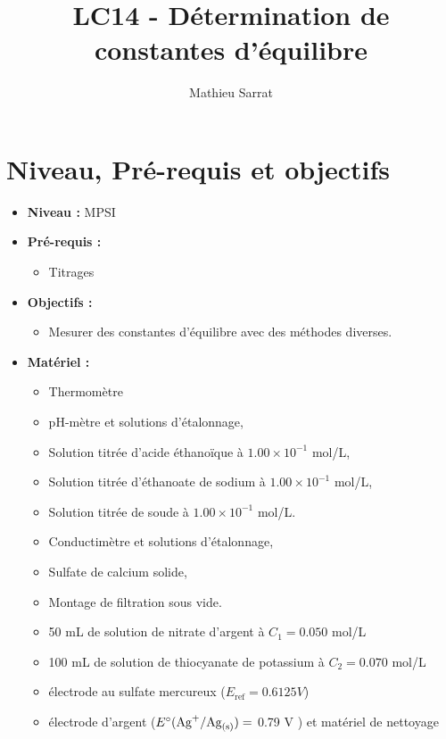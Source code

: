 \documentclass[11pt,a4paper]{report}
\author{Mathieu Sarrat}
\title{LC14 - Détermination de constantes d'équilibre}
\begin{document}
\maketitle

\section*{Niveau, Pré-requis et objectifs}
\begin{itemize}
	\item \textbf{Niveau :} MPSI\\
	
	\item \textbf{Pré-requis :}
	\begin{itemize}
		\item Titrages\\
	\end{itemize}
	
	\item \textbf{Objectifs :}
	\begin{itemize}
		\item Mesurer des constantes d'équilibre avec des méthodes diverses.\\
	\end{itemize}
		
	\item \textbf{Matériel :}
	\begin{itemize}
		\item Thermomètre\\
		
		\item pH-mètre et solutions d'étalonnage,
		\item Solution titrée d'acide éthanoïque à $1.00 \times 10^{-1}$ mol/L,
		\item Solution titrée d'éthanoate de sodium à $1.00 \times 10^{-1}$ mol/L,
		\item Solution titrée de soude à $1.00 \times 10^{-1}$ mol/L.\\
		
		\item Conductimètre et solutions d'étalonnage,
		\item Sulfate de calcium solide,
		\item Montage de filtration sous vide.\\

		\item 50 mL de solution de nitrate d'argent à $C_1 = 0.050$ mol/L
		\item 100 mL de solution de thiocyanate de potassium à $C_2 = 0.070$ mol/L
		\item électrode au sulfate mercureux ($E_\text{ref} = 0.6125 V$)
		\item électrode d'argent ($E\degree(\text{Ag}^+/\text{Ag}_\text{(s)}) =$ 0.79 V ) 
		et matériel de nettoyage\\


\end{itemize}
\end{itemize}
\end{document}
